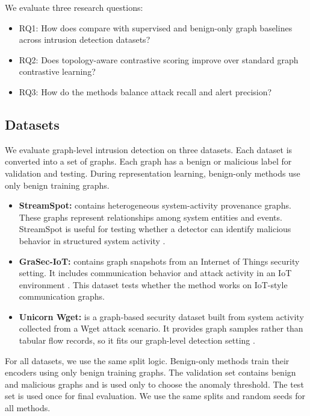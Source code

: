 We evaluate three research questions:

\begin{itemize}
    \item RQ1: How does \sysname{} compare with supervised and benign-only graph baselines across intrusion detection datasets?

    \item RQ2: Does topology-aware contrastive scoring improve over standard graph contrastive learning?

    \item RQ3: How do the methods balance attack recall and alert precision?
\end{itemize}

\subsection{Datasets}

We evaluate graph-level intrusion detection on three datasets. Each dataset is converted into a set of graphs. Each graph has a benign or malicious label for validation and testing. During representation learning, benign-only methods use only benign training graphs.

\begin{itemize}
    \item \textbf{StreamSpot:} contains heterogeneous system-activity provenance graphs. These graphs represent relationships among system entities and events. StreamSpot is useful for testing whether a detector can identify malicious behavior in structured system activity \cite{manzoor2016streamspot}.

    \item \textbf{GraSec-IoT:} contains graph snapshots from an Internet of Things security setting. It includes communication behavior and attack activity in an IoT environment \cite{hamouche2024graseciot}. This dataset tests whether the method works on IoT-style communication graphs.

    \item \textbf{Unicorn Wget:} is a graph-based security dataset built from system activity collected from a Wget attack scenario. It provides graph samples rather than tabular flow records, so it fits our graph-level detection setting \cite{unicornwget}.
\end{itemize}

For all datasets, we use the same split logic. Benign-only methods train their encoders using only benign training graphs. The validation set contains benign and malicious graphs and is used only to choose the anomaly threshold. The test set is used once for final evaluation. We use the same splits and random seeds for all methods.

